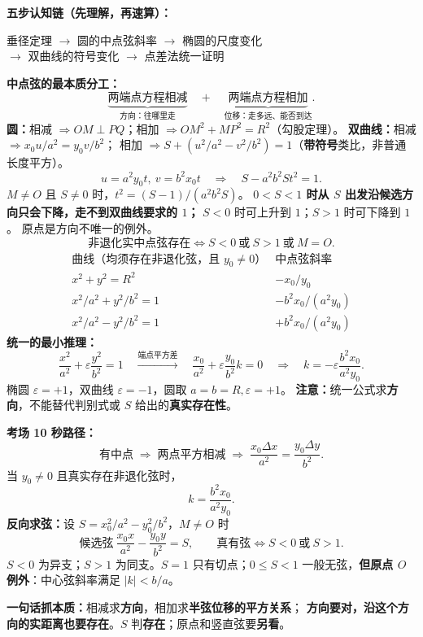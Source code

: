 \clearpage
\begin{summarybox}

\textbf{五步认知链（先理解，再速算）：}
\begin{center}
\small 垂径定理 $\to$ 圆的中点弦斜率 $\to$ 椭圆的尺度变化\\[2pt]
$\to$ 双曲线的符号变化 $\to$ 点差法统一证明
\end{center}
\textbf{中点弦的最本质分工：}
\[
\boxed{\underbrace{\text{两端点方程相减}}_{\text{方向：往哪里走}}}
\quad+\quad
\boxed{\underbrace{\text{两端点方程相加}}_{\text{位移：走多远、能否到达}}}.
\]
\textbf{圆：}相减 $\Rightarrow OM\perp PQ$；相加 $\Rightarrow OM^2+MP^2=R^2$（勾股定理）。
\textbf{双曲线：}相减 $\Rightarrow x_0u/a^2=y_0v/b^2$；
相加 $\Rightarrow S+(u^2/a^2-v^2/b^2)=1$（\textbf{带符号}类比，非普通长度平方）。
\[
\boxed{u=a^2y_0t,\ v=b^2x_0t}
\quad\Longrightarrow\quad
\boxed{S-a^2b^2St^2=1}.
\]
$M\ne O$ 且 $S\ne0$ 时，$t^2=(S-1)/(a^2b^2S)$。
\textbf{$0<S<1$ 时从 $S$ 出发沿候选方向只会下降，走不到双曲线要求的 $1$；}
$S<0$ 时可上升到 $1$；$S>1$ 时可下降到 $1$。
原点是方向不唯一的例外。
\[
\boxed{\text{非退化实中点弦存在}\iff S<0\ \text{或}\ S>1\ \text{或}\ M=O}.
\]
\[
\begin{array}{c|c}
\text{曲线（均须存在非退化弦，且 }y_0\ne0\text{）}&\text{中点弦斜率}\\\hline
x^2+y^2=R^2 & -x_0/y_0\\[2pt]
 x^2/a^2+y^2/b^2=1 & -b^2x_0/(a^2y_0)\\[2pt]
 x^2/a^2-y^2/b^2=1 & +b^2x_0/(a^2y_0)
\end{array}
\]
\textbf{统一的最小推理：}
\[
\frac{x^2}{a^2}+\varepsilon\frac{y^2}{b^2}=1
\quad\xrightarrow{\text{端点平方差}}\quad
\boxed{\frac{x_0}{a^2}+\varepsilon\frac{y_0}{b^2}k=0}
\quad\Longrightarrow\quad
\boxed{k=-\varepsilon\frac{b^2x_0}{a^2y_0}}.
\]
椭圆 $\varepsilon=+1$，双曲线 $\varepsilon=-1$，圆取 $a=b=R,\varepsilon=+1$。
\textbf{注意：}统一公式求\textbf{方向}，不能替代判别式或 $S$ 给出的\textbf{真实存在性}。
\par\medskip\noindent
\textbf{考场 10 秒路径：}
\[
\boxed{\text{有中点}\;\Longrightarrow\;\text{两点平方相减}\;\Longrightarrow\;
\frac{x_0\Delta x}{a^2}=\frac{y_0\Delta y}{b^2}}.
\]
当 $y_0\ne0$ 且真实存在非退化弦时，
\[
\boxed{k=\frac{b^2x_0}{a^2y_0}}.
\]
\textbf{反向求弦：}设 $S=x_0^2/a^2-y_0^2/b^2$，$M\ne O$ 时
\[
\boxed{\text{候选弦}\ \frac{x_0x}{a^2}-\frac{y_0y}{b^2}=S},\qquad
\boxed{\text{真有弦}\iff S<0\ \text{或}\ S>1}.
\]
$S<0$ 为异支；$S>1$ 为同支。$S=1$ 只有切点；$0\le S<1$ 一般无弦，\textbf{但原点 $O$ 例外}：中心弦斜率满足 $|k|<b/a$。
\par\medskip\noindent
\textbf{一句话抓本质：}相减求\textbf{方向}，相加求\textbf{半弦位移的平方关系}；
\textbf{方向要对，沿这个方向的实距离也要存在}。$S$ 判\textbf{存在}；原点和竖直弦要\textbf{另看}。
\end{summarybox}
